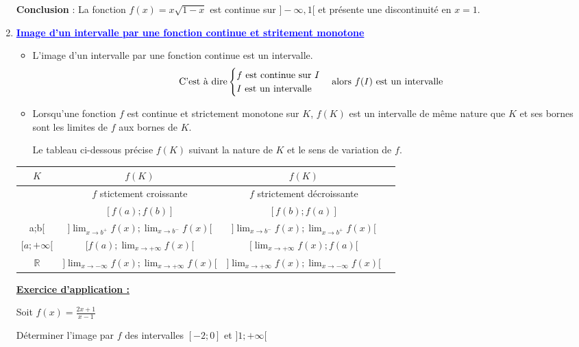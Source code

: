\documentclass{article}
\newcounter{exerciceapp}
\newcommand{\exerciceapp}{%
  \refstepcounter{exerciceapp}%
  \textbf{\textcolor{myorange}{Exercice d'application \theexerciceapp :}} \ignorespaces
}
\begin{document}
\begin{enumerate}[label=\arabic*)]
\textbf{Conclusion} : La fonction \( f(x) = x\sqrt{1 - x} \) est continue sur \( ]-\infty, 1[ \) et présente une discontinuité en \( x = 1 \).

\item \textbf{\textcolor{blue}{\underline{Image d’un intervalle par une fonction continue et stritement monotone}}}
\begin{itemize}
\item L’image d’un intervalle par une fonction continue est un intervalle.
\[
\text{C’est à dire}
\begin{cases}
\text{\( f \) est continue sur \( I \)}\\
\text{\( I \) est un intervalle}
\end{cases}
\text{alors \( f(I) \) est un intervalle}
\]

\item Lorsqu’une fonction \( f \) est continue et strictement monotone sur \( K \), \( f(K) \) est un intervalle de même nature que \( K \) et ses bornes sont les limites de \( f \) aux bornes de \( K \).

Le tableau ci-dessous précise \( f(K) \) suivant la nature de \( K \) et le sens de variation de \( f \).
\end{itemize}
\begin{tabular}{|c|c|c|c|}
\hline
\( K \) & \( f(K) \) & \( f(K) \)\\
\hline
				& \( f \) stictement croissante & \( f \) strictement décroissante\\
\hline
[a;b]		& \( [f(a);f(b)] \) & \( [f(b);f(a)] \)       \\
\hline
[a;b[	& \( [f(a);\lim_{x\to b^{-}}f(x)[ \) &	\( [\lim_{x\to b^{-}}f(x);f(a)[ \)	\\
\hline
]a;b[		& \( ]\lim_{x\to b^{+}}f(x);\lim_{x\to b^{-}}f(x)[ \) &	\( ]\lim_{x\to b^{-}}f(x);\lim_{x\to b^{+}}f(x)[ \)	\\
\hline
\( [a;+\infty[ \)	& \( [f(a);\lim_{x\to +\infty}f(x)[ \) &\( [\lim_{x\to +\infty}f(x);f(a)[ \)		\\
\hline
\( \mathbb{R} \)& \( ]\lim_{x\to -\infty}f(x);\lim_{x\to +\infty}f(x)[ \)&\( ]\lim_{x\to +\infty}f(x);\lim_{x\to -\infty}f(x)[ \)\\
\hline
\end{tabular}

			\textbf{\underline{\exerciceapp}}
			
				Soit \( f(x)=\frac{2x+1}{x-1} \)
				
				Déterminer l’image par \( f \) des intervalles \( [-2;0] \) et \( ]1;+\infty[ \)
				

\end{enumerate}
\end{document}

